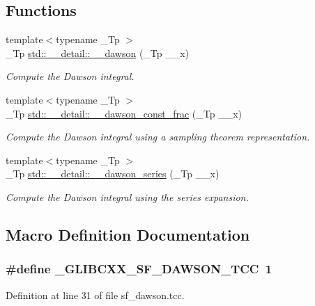 \subsection*{Functions}
\begin{DoxyCompactItemize}
\item 
{\footnotesize template$<$typename \+\_\+\+Tp $>$ }\\\+\_\+\+Tp \hyperlink{namespacestd_1_1____detail_a6384fb4c5af31b41a38c120869a548c7}{std\+::\+\_\+\+\_\+detail\+::\+\_\+\+\_\+dawson} (\+\_\+\+Tp \+\_\+\+\_\+x)
\begin{DoxyCompactList}\small\item\em Compute the Dawson integral. \end{DoxyCompactList}\item 
{\footnotesize template$<$typename \+\_\+\+Tp $>$ }\\\+\_\+\+Tp \hyperlink{namespacestd_1_1____detail_a3fe9fa143beb1a5d9f8ca18b3783f650}{std\+::\+\_\+\+\_\+detail\+::\+\_\+\+\_\+dawson\+\_\+const\+\_\+frac} (\+\_\+\+Tp \+\_\+\+\_\+x)
\begin{DoxyCompactList}\small\item\em Compute the Dawson integral using a sampling theorem representation. \end{DoxyCompactList}\item 
{\footnotesize template$<$typename \+\_\+\+Tp $>$ }\\\+\_\+\+Tp \hyperlink{namespacestd_1_1____detail_a033d91cc1c67280385ff3d1d809a21d1}{std\+::\+\_\+\+\_\+detail\+::\+\_\+\+\_\+dawson\+\_\+series} (\+\_\+\+Tp \+\_\+\+\_\+x)
\begin{DoxyCompactList}\small\item\em Compute the Dawson integral using the series expansion. \end{DoxyCompactList}\end{DoxyCompactItemize}


\subsection{Macro Definition Documentation}
\hypertarget{sf__dawson_8tcc_a72d0ce5cd51240da4fb2546e640923de}{}
\subsubsection[{\+\_\+\+G\+L\+I\+B\+C\+X\+X\+\_\+\+S\+F\+\_\+\+D\+A\+W\+S\+O\+N\+\_\+\+T\+C\+C}]{\setlength{\rightskip}{0pt plus 5cm}\#define \+\_\+\+G\+L\+I\+B\+C\+X\+X\+\_\+\+S\+F\+\_\+\+D\+A\+W\+S\+O\+N\+\_\+\+T\+C\+C~1}\label{sf__dawson_8tcc_a72d0ce5cd51240da4fb2546e640923de}


Definition at line 31 of file sf\+\_\+dawson.\+tcc.

